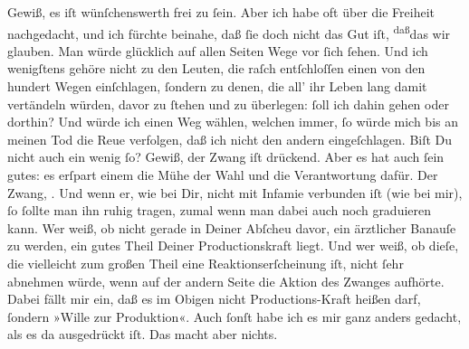 \begin{ledgroupsized}[t]{13cm}
               Gewiß, es iſt wünſchenswerth frei zu ſein. Aber ich habe oft über die Freiheit
               nachgedacht, und ich fürchte beinahe, daß ſie doch nicht das Gut iſt, \substVorne{}\textsuperscript{daß}\substDazwischen{}das\substHinten{} wir glauben. Man würde glücklich auf allen Seiten Wege vor ſich ſehen. Und
               ich wenigſtens gehöre nicht zu den Leuten, die raſch entſchloſſen einen von den
               hundert Wegen einſchlagen, ſondern zu denen, die all’ ihr Leben lang damit vertändeln
               würden, davor zu ſtehen {\pb}und zu überlegen: ſoll ich
               dahin gehen oder dorthin? Und würde ich einen Weg wählen, welchen immer, ſo würde
               mich bis an meinen Tod die Reue verfolgen, daß ich nicht den andern eingeſchlagen.
               Biſt Du nicht auch ein wenig ſo? Gewiß, der Zwang iſt drückend. Aber es hat auch ſein
               gutes: es erſpart einem die Mühe der Wahl und die Verantwortung dafür. Der Zwang,
                  \label{K_L02621-3v}\label{K_L02621-3h}. Und wenn er, wie bei Dir, nicht mit Infamie verbunden iſt (wie
               bei mir), ſo ſollte man ihn {\pb}ruhig tragen, zumal
               wenn man dabei auch noch graduieren kann. Wer weiß, ob nicht gerade in Deiner Abſcheu
               davor, ein ärztlicher  Banauſe zu werden, ein
               gutes Theil Deiner Productionskraft liegt. Und wer weiß, ob dieſe, die vielleicht zum
               großen Theil eine Reaktionserſcheinung iſt, nicht ſehr abnehmen würde, wenn auf der
               andern Seite die Aktion des Zwanges aufhörte. Dabei fällt mir ein, daß es im Obigen
               nicht Productions-Kraft heißen darf, ſondern »Wille zur Produktion«. Auch ſonſt habe
               ich es mir ganz {\pb}anders gedacht, als es da
               ausgedrückt iſt. Das macht aber nichts.\pend
           \pstart

\end{ledgroupsized}
